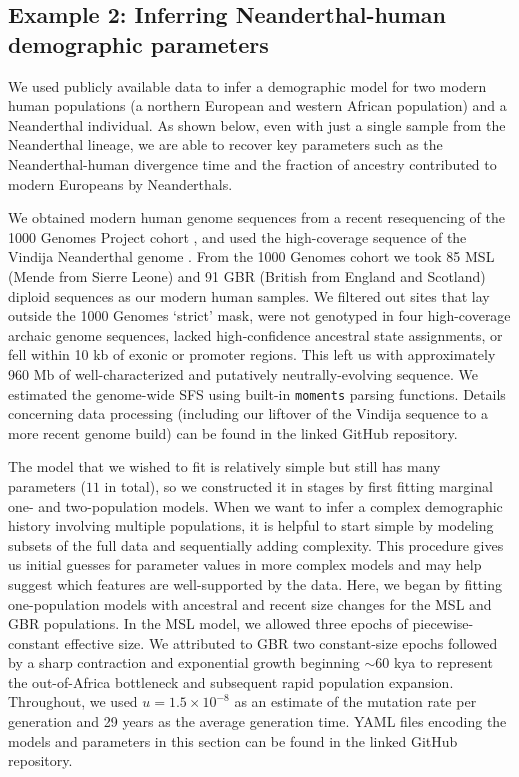 \documentclass[]{article}
\newcommand{\moments}{\texttt{moments}\xspace}
\begin{document}
\subsection*{Example 2: Inferring Neanderthal-human demographic parameters}

We used publicly available data to infer a demographic model for two
modern human populations (a northern European and western African population) 
and a Neanderthal individual. As shown below, even with just a single sample 
from the Neanderthal lineage, we are able to recover key parameters such as the
Neanderthal-human divergence time and the fraction of ancestry contributed to 
modern Europeans by Neanderthals.

We obtained modern human genome sequences from a recent resequencing of the
1000 Genomes Project cohort \cite{byrska2022high}, and used the high-coverage
sequence of the Vindija Neanderthal genome \cite{prufer2017high}.  From the
1000 Genomes cohort we took 85 MSL (Mende from Sierre Leone) and 91 GBR
(British from England and Scotland) diploid sequences as our modern human
samples. We filtered out sites that lay outside the 1000 Genomes `strict' mask,
were not genotyped in four high-coverage archaic genome sequences, lacked
high-confidence ancestral state assignments, or fell within 10 kb of exonic or
promoter regions. This left us with approximately 960 Mb of well-characterized
and putatively neutrally-evolving sequence. We estimated the genome-wide SFS
using built-in \moments parsing functions. Details concerning data processing
(including our liftover of the Vindija sequence to a more recent genome build)
can be found in the linked GitHub repository.

The model that we wished to fit is relatively simple but still has many
parameters ($11$ in total), so we constructed it in stages by first fitting
marginal one- and two-population models. When we want to infer a complex
demographic history involving multiple populations, it is helpful to start
simple by modeling subsets of the full data and sequentially adding complexity.
This procedure gives us initial guesses for parameter values in more complex
models and may help suggest which features are well-supported by the data.
Here, we began by fitting one-population models with ancestral and recent size
changes for the MSL and GBR populations. In the MSL model, we allowed three
epochs of piecewise-constant effective size. We attributed to GBR two
constant-size epochs followed by a sharp contraction and exponential growth
beginning $\sim$60 kya to represent the out-of-Africa bottleneck and subsequent
rapid population expansion. Throughout, we used $u=1.5\times 10^{-8}$ as an
estimate of the mutation rate per generation and 29 years as the average
generation time. YAML files encoding the models and parameters in this section
can be found in the linked GitHub repository.
\end{document}
